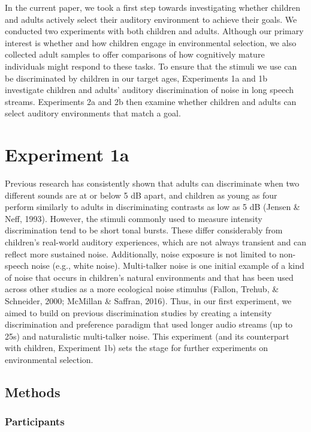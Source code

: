 \documentclass[10pt, letterpaper]{article}
\begin{document}
In the current paper, we took a first step towards investigating whether
children and adults actively select their auditory environment to
achieve their goals. We conducted two experiments with both children and
adults. Although our primary interest is whether and how children engage
in environmental selection, we also collected adult samples to offer
comparisons of how cognitively mature individuals might respond to these
tasks. To ensure that the stimuli we use can be discriminated by
children in our target ages, Experiments 1a and 1b investigate children
and adults' auditory discrimination of noise in long speech streams.
Experiments 2a and 2b then examine whether children and adults can
select auditory environments that match a goal.

\hypertarget{experiment-1a}{%
\section{Experiment 1a}\label{experiment-1a}}

Previous research has consistently shown that adults can discriminate
when two different sounds are at or below 5 dB apart, and children as
young as four perform similarly to adults in discriminating contrasts as
low as 5 dB (Jensen \& Neff, 1993). However, the stimuli commonly used
to measure intensity discrimination tend to be short tonal bursts. These
differ considerably from children's real-world auditory experiences,
which are not always transient and can reflect more sustained noise.
Additionally, noise exposure is not limited to non-speech noise (e.g.,
white noise). Multi-talker noise is one initial example of a kind of
noise that occurs in children's natural environments and that has been
used across other studies as a more ecological noise stimulus (Fallon,
Trehub, \& Schneider, 2000; McMillan \& Saffran, 2016). Thus, in our
first experiment, we aimed to build on previous discrimination studies
by creating a intensity discrimination and preference paradigm that used
longer audio streams (up to 25s) and naturalistic multi-talker noise.
This experiment (and its counterpart with children, Experiment 1b) sets
the stage for further experiments on environmental selection.

\hypertarget{methods}{%
\subsection{Methods}\label{methods}}

\hypertarget{participants}{%
\subsubsection{Participants}\label{participants}}
\end{document}
